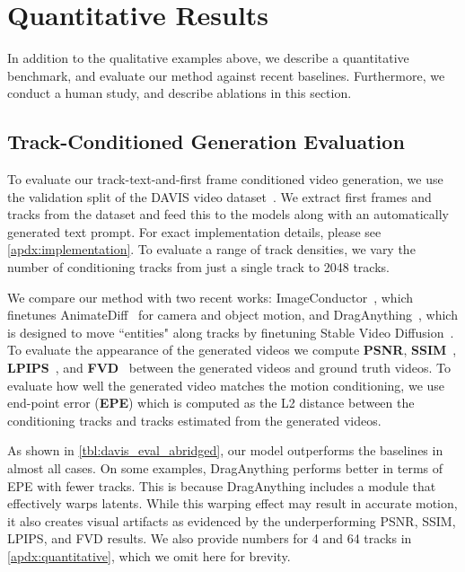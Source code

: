 \section{Quantitative Results}
\label{sec:quantitative}

In addition to the qualitative examples above, we describe a quantitative benchmark, and evaluate our method against recent baselines. Furthermore, we conduct a human study, and describe ablations in this section.

\subsection{Track-Conditioned Generation Evaluation}
\label{sec:davis_eval}

To evaluate our track-text-and-first frame conditioned video generation, we use the validation split of the DAVIS video dataset~\cite{pont20172017}. We extract first frames and tracks from the dataset and feed this to the models along with an automatically generated text prompt. For exact implementation details, please see \cref{apdx:implementation}. 
To evaluate a range of track densities, we vary the number of conditioning tracks from just a single track to 2048 tracks.

We compare our method with two recent works: ImageConductor~\cite{li2024image}, which finetunes AnimateDiff~\cite{guo2023animatediff} for camera and object motion, and DragAnything~\cite{wu2024draganything}, which is designed to move ``entities" along tracks by finetuning Stable Video Diffusion~\cite{blattmann2023stable}.
To evaluate the appearance of the generated videos we compute \textbf{PSNR}, \textbf{SSIM}~\cite{wang2004image}, \textbf{LPIPS}~\cite{zhang2018perceptual}, and \textbf{FVD}~\cite{unterthiner2019fvd} between the generated videos and ground truth videos. 
To evaluate how well the generated video matches the motion conditioning, we use end-point error (\textbf{EPE}) which is computed as the L2 distance between the conditioning tracks and tracks estimated from the generated videos.



As shown in \cref{tbl:davis_eval_abridged}, our model outperforms the baselines in almost all cases.
On some examples, DragAnything performs better in terms of EPE with fewer tracks.
This is because DragAnything includes a module that effectively warps latents.
While this warping effect may result in accurate motion, it also creates visual artifacts as evidenced by the underperforming PSNR, SSIM, LPIPS, and FVD results. We also provide numbers for 4 and 64 tracks in \cref{apdx:quantitative}, which we omit here for brevity.

